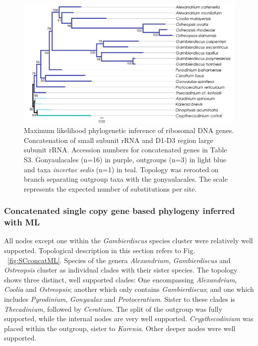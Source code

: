 \documentclass[fleqn,10pt,lineno]{wlpeerj} %
\begin{document}
\begin{figure}[ht]
\centering
\includegraphics[width=\linewidth]{gonya-figs/rDNA-ML.png} 
\caption{Maximum likelihood phylogenetic inference of ribosomal DNA genes. Concatenation of small subunit rRNA and D1-D3 region large subunit rRNA. Accession numbers for concatenated genes in Table S3. Gonyaulacales (n=16) in purple, outgroups (n=3) in light blue and taxa \textit{incertae sedis} (n=1) in teal. Topology was rerooted on branch separating outgroup taxa with the gonyaulacales. The scale represents the expected number of substitutions per site.} 
\label{fig:rdna}
\end{figure} 

\subsubsection*{Concatenated single copy gene based phylogeny inferred with ML}
All nodes except one within the \emph{Gambierdiscus} species cluster were relatively well supported. 
Topological description in this section refers to Fig. ~\ref{fig:SCconcatML}. 
Species of the genera \emph{Alexandrium}, \emph{Gambierdiscus} and \emph{Ostreopsis} cluster as individual clades with their sister species.  
The topology shows three distinct, well supported clades: 
One encompassing \emph{Alexandrium}, \emph{Coolia} and \emph{Ostreopsis}; another which only contains \emph{Gambierdiscus}; and one which includes \emph{Pyrodinium}, \emph{Gonyaulax} and \emph{Protoceratium}. 
Sister to these clades is \emph{Thecadinium}, followed by \emph{Ceratium}.
The split of the outgroup was fully supported, while the internal nodes are very well supported. 
\emph{Crypthecodinium} was placed within the outgroup, sister to \emph{Karenia}. 
Other deeper nodes were well supported.
 
\end{document}
